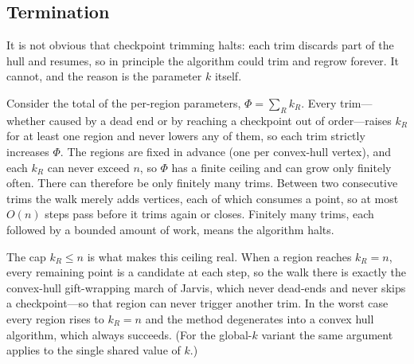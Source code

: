\documentclass[10pt,twocolumn]{article}
\begin{document}
\subsection{Termination}
It is not obvious that checkpoint trimming halts: each trim discards part of the hull and resumes, so in principle the algorithm could trim and regrow forever. It cannot, and the reason is the parameter $k$ itself.

Consider the total of the per-region parameters, $\Phi = \sum_{R} k_R$. Every trim---whether caused by a dead end or by reaching a checkpoint out of order---raises $k_R$ for at least one region and never lowers any of them, so each trim strictly increases $\Phi$. The regions are fixed in advance (one per convex-hull vertex), and each $k_R$ can never exceed $n$, so $\Phi$ has a finite ceiling and can grow only finitely often. There can therefore be only finitely many trims. Between two consecutive trims the walk merely adds vertices, each of which consumes a point, so at most $O(n)$ steps pass before it trims again or closes. Finitely many trims, each followed by a bounded amount of work, means the algorithm halts.

The cap $k_R \le n$ is what makes this ceiling real. When a region reaches $k_R = n$, every remaining point is a candidate at each step, so the walk there is exactly the convex-hull gift-wrapping march of Jarvis, which never dead-ends and never skips a checkpoint---so that region can never trigger another trim. In the worst case every region rises to $k_R = n$ and the method degenerates into a convex hull algorithm, which always succeeds. (For the global-$k$ variant the same argument applies to the single shared value of $k$.)
\end{document}
